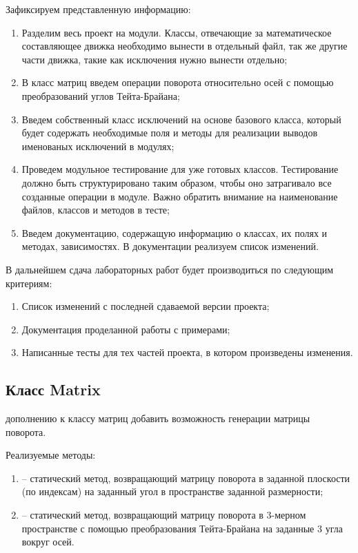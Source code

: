 	Зафиксируем представленную информацию:
	\begin{enumerate}
		\item Разделим весь проект на модули. Классы, отвечающие за математическое составляющее движка необходимо вынести в отдельный файл, так же другие части движка, такие как исключения нужно вынести отдельно;
		\item В класс матриц введем операции поворота относительно осей с помощью преобразований углов Тейта-Брайана;
		\item Введем собственный класс исключений на основе базового класса, который будет содержать необходимые поля и методы для реализации выводов именованых исключений в модулях;
		\item Проведем модульное тестирование для уже готовых классов. Тестирование должно быть структурировано таким образом, чтобы оно затрагивало все созданные операции в модуле. Важно обратить внимание на наименование файлов, классов и методов в тесте;
		\item Введем документацию, содержащую информацию о классах, их полях и методах, зависимостях. В документации реализуем список изменений.

	\end{enumerate}

	В дальнейшем сдача лабораторных работ будет производиться по следующим критериям:
	\begin{enumerate}
		\item Список изменений с последней сдаваемой версии проекта;
		\item Документация проделанной работы с примерами;
		\item Написанные тесты для тех частей проекта, в котором произведены изменения.
	\end{enumerate}


\subsection{Класс Matrix}
	 дополнению к классу матриц добавить возможность генерации матрицы поворота.

	\noindent Реализуемые методы:
	\begin{enumerate}
		\item {} -- статический метод, возвращающий матрицу поворота в заданной плоскости (по индексам) на заданный угол в пространстве заданной размерности;
		\item {} -- статический метод, возвращающий матрицу поворота в $3$-мерном пространстве с помощью преобразования Тейта-Брайана на заданные $3$ угла вокруг осей.
	\end{enumerate}
